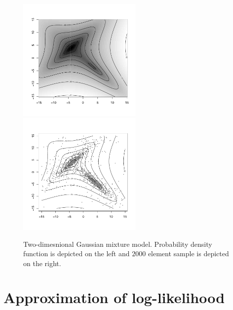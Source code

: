 \documentclass{article}
\begin{document}
\begin{figure}[!t]
\begin{center}
\includegraphics[width=6cm,trim=1cm 1.5cm 0cm 1.0cm, clip]{illustrations/gmm-example-i.pdf}\hspace*{0cm}
\includegraphics[width=6cm,trim=1cm 1.5cm 0cm 1.0cm, clip]{illustrations/gmm-example-ii.pdf}
\end{center}
\caption{Two-dimesnional Gaussian mixture model. Probability density function is depicted on the left and $2000$ element sample is depicted on the right.}
\label{fig:gmm}
\end{figure}

\section{Approximation of log-likelihood}
\end{document}
